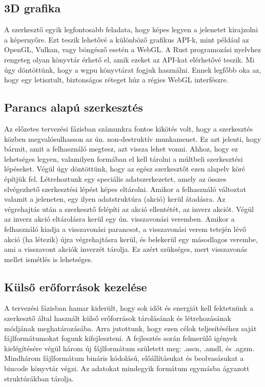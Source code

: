 \subsection{3D grafika}

A szerkesztő egyik legfontosabb feladata, hogy képes legyen a jelenetet kirajzolni a képernyőre.
Ezt teszik lehetővé a különböző grafikus API-k, mint például az OpenGL, Vulkan, vagy böngésző
esetén a WebGL. A Rust programozási nyelvhez rengeteg olyan könyvtár érhető el, amik ezeket az
API-kat elérhetővé teszik. Mi úgy döntöttünk, hogy a wgpu könyvtárat fogjuk használni. Ennek
legfőbb oka az, hogy egy letisztult, biztonságos réteget húz a régies WebGL interfészre.

\subsection{Parancs alapú szerkesztés}

Az előzetes tervezési fázisban számunkra fontos kikötés volt, hogy a szerkesztés közben
megvalósulhasson az ún. non-destruktív munkamenet. Ez azt jelenti, hogy bármit, amit a felhasználó
megtesz, azt vissza lehet vonni. Ahhoz, hogy ez lehetséges legyen, valamilyen formában el kell
tárolni a múltbeli szerkesztési lépéseket. Végül úgy döntöttünk, hogy az egész szerkesztőt ezen
alapelv köré építjük fel. Létrehoztunk egy speciális adatszerkezetet, amely az összes elvégezhető
szerkesztési lépést képes eltárolni. Amikor a felhasználó változtat valamit a jeleneten, egy
ilyen adatstruktúra (akció) kerül átadásra. Az végrehajtás után a szerkesztő felépíti az akció
ellentétét, az inverz akciót. Végül az inverz akció eltárolásra kerül egy ún. visszavonási veremben.
Amikor a felhasználó kiadja a visszavonási parancsot, a visszavonási verem tetején lévő akció
(ha létezik) újra végrehajtásra kerül, és belekerül egy másodlagos verembe, ami a visszavont
akciók inverzét tárolja. Ez azért szükséges, mert visszavonás mellet ismétlés is lehetséges.

\subsection{Külső erőforrások kezelése}

A tervezési fázisban hamar kiderült, hogy sok időt és energiát kell fektetnünk a szerkesztő által
használt külső erőforrások tárolásának és létrehozásának módjának meghatározásába. Arra jutottunk,
hogy ezen célok teljesítéséhez saját fájlformátumokat fogunk kifejleszteni. A fejlesztés során
felmerülő igények kielégítésére végül három új fájlformátum született meg: .ascn, .amdl, és .agzm.
Mindhárom fájlformátum bináris kódolású, előállításukat és beolvasásukat a bincode könyvtár
végzi. Az adatokat mindegyik formátum egymásba ágyazott struktúrákban tárolja.

